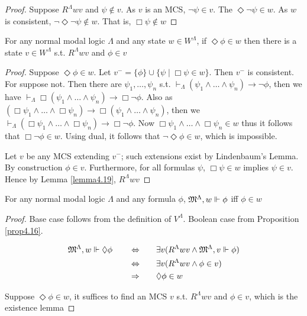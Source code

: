 \documentclass[11pt]{article}
\begin{document}
\begin{proof}
Suppose \(R^\Lambda wv\) and \(\psi\not\in v\). As \(v\) is an MCS, \(\neg\psi\in
   v\). The \(\Diamond\neg\psi\in w\). As \(w\) is consistent,
\(\neg\Diamond\neg\psi\not\in w\). That is, \(\Box\psi\not\in w\)
\end{proof}

\begin{lemma}
For any normal modal logic \(\Lambda\) and any state \(w\in W^\Lambda\), if
\(\Diamond\phi\in w\) then there is a state \(v\in W^\Lambda\) s.t.
\(R^\Lambda wv\) and \(\phi\in v\)
\end{lemma}

\begin{proof}
Suppose \(\Diamond\phi\in w\). Let \(v^-=\{\phi\}\cup\{\psi\mid\Box\psi\in
   w\}\). Then \(v^-\) is consistent. For suppose not. Then there are
\(\psi_1,\dots,\psi_n\) s.t.
\(\vdash_\Lambda(\psi_1\wedge\dots\wedge\psi_n)\to\neg\phi\), then we have
\(\vdash_\Lambda\Box(\psi_1\wedge\dots\wedge\psi_n)\to\Box\neg\phi\).  Also
as
\((\Box\psi_1\wedge\dots\wedge\Box\psi_n)\to\Box(\psi_1\wedge\dots\wedge\psi_n)\),
then we
\(\vdash_\Lambda(\Box\psi_1\wedge\dots\wedge\Box\psi_n)\to\Box\neg\phi\). Now
\(\Box\psi_1\wedge\dots\wedge\Box\psi_n\in w\) thus it follows that
\(\Box\neg\phi\in w\). Using dual, it follows that \(\neg\Diamond\phi\in w\),
which is impossible.

Let \(v\) be any MCS extending \(v^-\); such extensions exist by Lindenbaum's
Lemma. By construction \(\phi\in v\). Furthermore, for all formulas \(\psi\),
\(\Box\psi\in w\) implies \(\psi\in v\). Hence by Lemma \ref{lemma4.19},
\(R^\Lambda wv\)
\end{proof}

\begin{lemma}
For any normal modal logic \(\Lambda\) and any formula \(\phi\), \(\mathfrak{M}^\Lambda,w\Vdash\phi\) iff
\(\phi\in w\)
\end{lemma}

\begin{proof}
Base case follows from the definition of \(V^\Lambda\). Boolean case from
Proposition \ref{prop4.16}.

\begin{alignat*}{3}
&\mathfrak{M}^\Lambda,w\Vdash\Diamond\phi\quad&&\Leftrightarrow
\quad&&\exists v(R^\Lambda wv\wedge\mathfrak{M}^\Lambda,v\Vdash\phi)\\
&&&\Leftrightarrow&&\exists v(R^\Lambda wv\wedge\phi\in v)\\
&&&\Rightarrow&&\Diamond\phi\in w
\end{alignat*}

Suppose \(\Diamond\phi\in w\), it suffices to find an MCS \(v\) s.t.
\(R^\Lambda wv\) and \(\phi\in v\), which is the existence lemma
\end{proof}
\end{document}
